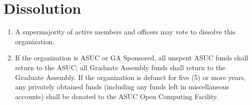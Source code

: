 \documentclass[english,a4paper]{article}
\begin{document}
\section{Dissolution}
\begin{enumerate}

\item
  A supermajority of active members and officers may vote to dissolve
  this organization.

\item
  If the organization is ASUC or GA Sponsored, all unspent ASUC funds
  shall return to the ASUC; all Graduate Assembly funds shall return
  to the Graduate Assembly. If the organization is defunct for five
  (5) or more years, any privately obtained funds (including any funds
  left in miscellaneous accounts) shall be donated to the ASUC Open Computing
  Facility.
\end{enumerate}
\end{document}
